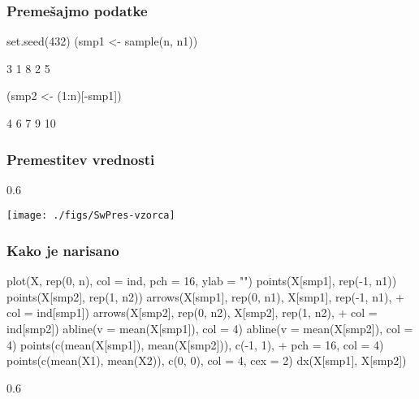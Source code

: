 \begin{frame}[fragile]
\frametitle{Premešajmo podatke}
\begin{Schunk}
\begin{Sinput}
 set.seed(432)
 (smp1 <- sample(n, n1))
\end{Sinput}
\begin{Soutput}
[1] 3 1 8 2 5
\end{Soutput}
\begin{Sinput}
 (smp2 <- (1:n)[-smp1])
\end{Sinput}
\begin{Soutput}
[1]  4  6  7  9 10
\end{Soutput}
\end{Schunk}
\end{frame}

\begin{frame}[fragile]
\frametitle{Premestitev vrednosti}
\begin{Schunk}
\begin{Soutput}
[1] 0.6
\end{Soutput}
\end{Schunk}
\texttt{[image: ./figs/SwPres-vzorca]}
\end{frame}

\begin{frame}[fragile]
\frametitle{Kako je narisano}
\begin{Schunk}
\begin{Sinput}
 plot(X, rep(0, n), col = ind, pch = 16, ylab = "")
 points(X[smp1], rep(-1, n1))
 points(X[smp2], rep(1, n2))
 arrows(X[smp1], rep(0, n1), X[smp1], rep(-1, n1), 
+     col = ind[smp1])
 arrows(X[smp2], rep(0, n2), X[smp2], rep(1, n2), 
+     col = ind[smp2])
 abline(v = mean(X[smp1]), col = 4)
 abline(v = mean(X[smp2]), col = 4)
 points(c(mean(X[smp1]), mean(X[smp2])), c(-1, 1), 
+     pch = 16, col = 4)
 points(c(mean(X1), mean(X2)), c(0, 0), col = 4, cex = 2)
 dx(X[smp1], X[smp2])
\end{Sinput}
\begin{Soutput}
[1] 0.6
\end{Soutput}
\end{Schunk}
\end{frame}

